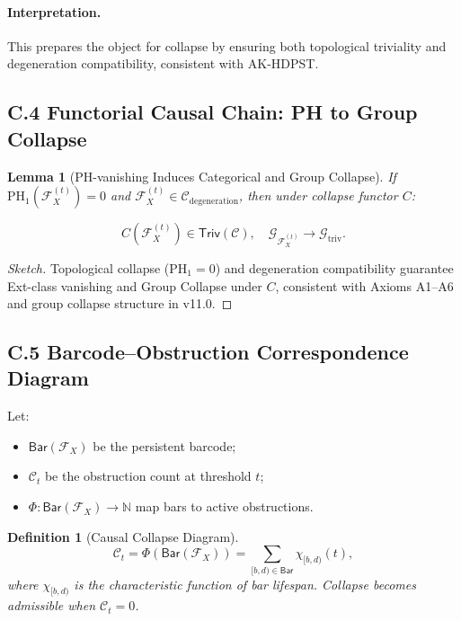 \documentclass[11pt]{article}
\newtheorem{definition}[theorem]{Definition}
\newtheorem{lemma}[theorem]{Lemma}
\begin{document}
\paragraph{Interpretation.}
This prepares the object for collapse by ensuring both topological triviality and degeneration compatibility, consistent with AK-HDPST.

\subsection*{C.4 Functorial Causal Chain: PH to Group Collapse}

\begin{lemma}[PH-vanishing Induces Categorical and Group Collapse]
If \( \mathrm{PH}_1(\mathcal{F}_X^{(t)}) = 0 \) and \( \mathcal{F}_X^{(t)} \in \mathcal{C}_{\mathrm{degeneration}} \), then under collapse functor \( C \):

\[
C(\mathcal{F}_X^{(t)}) \in \mathsf{Triv}(\mathcal{C}), \quad \mathcal{G}_{\mathcal{F}_X^{(t)}} \longrightarrow \mathcal{G}_{\mathrm{triv}}.
\]
\end{lemma}

\begin{proof}[Sketch]
Topological collapse (\( \mathrm{PH}_1 = 0 \)) and degeneration compatibility guarantee Ext-class vanishing and Group Collapse under \( C \), consistent with Axioms A1–A6 and group collapse structure in v11.0.
\end{proof}

\subsection*{C.5 Barcode–Obstruction Correspondence Diagram}

Let:

\begin{itemize}
    \item \( \mathsf{Bar}(\mathcal{F}_X) \) be the persistent barcode;
    \item \( \mathcal{C}_t \) be the obstruction count at threshold \( t \);
    \item \( \Phi : \mathsf{Bar}(\mathcal{F}_X) \to \mathbb{N} \) map bars to active obstructions.
\end{itemize}

\begin{definition}[Causal Collapse Diagram]
\[
\mathcal{C}_t = \Phi(\mathsf{Bar}(\mathcal{F}_X)) = \sum_{[b,d) \in \mathsf{Bar}} \chi_{[b,d)}(t),
\]
where \( \chi_{[b,d)} \) is the characteristic function of bar lifespan. Collapse becomes admissible when \( \mathcal{C}_t = 0 \).
\end{definition}
\end{document}
